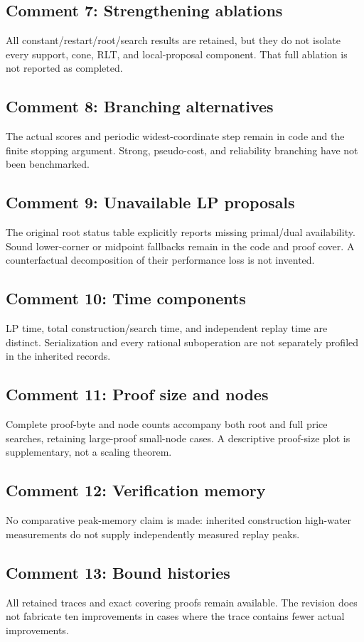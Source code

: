 \subsection{Comment 7: Strengthening ablations}
All constant/restart/root/search results are retained, but they do not isolate every support, cone, RLT, and local-proposal component. That full ablation is not reported as completed.

\subsection{Comment 8: Branching alternatives}
The actual scores and periodic widest-coordinate step remain in code and the finite stopping argument. Strong, pseudo-cost, and reliability branching have not been benchmarked.

\subsection{Comment 9: Unavailable LP proposals}
The original root status table explicitly reports missing primal/dual availability. Sound lower-corner or midpoint fallbacks remain in the code and proof cover. A counterfactual decomposition of their performance loss is not invented.

\subsection{Comment 10: Time components}
LP time, total construction/search time, and independent replay time are distinct. Serialization and every rational suboperation are not separately profiled in the inherited records.

\subsection{Comment 11: Proof size and nodes}
Complete proof-byte and node counts accompany both root and full price searches, retaining large-proof small-node cases. A descriptive proof-size plot is supplementary, not a scaling theorem.

\subsection{Comment 12: Verification memory}
No comparative peak-memory claim is made: inherited construction high-water measurements do not supply independently measured replay peaks.

\subsection{Comment 13: Bound histories}
All retained traces and exact covering proofs remain available. The revision does not fabricate ten improvements in cases where the trace contains fewer actual improvements.


